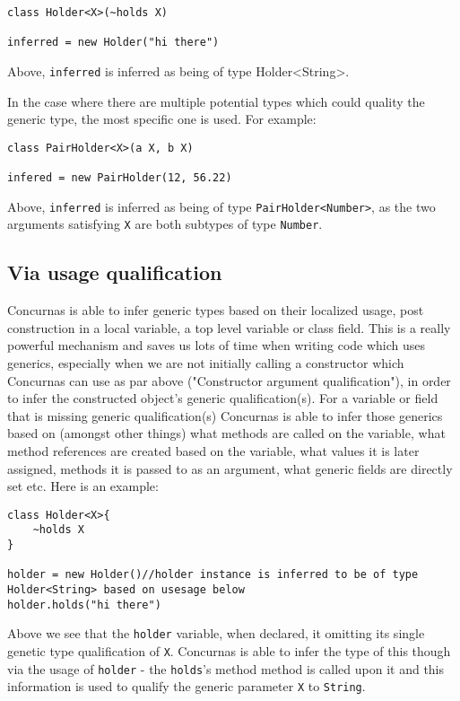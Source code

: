 \documentclass[conc-doc]{subfiles}
\begin{document}
\begin{lstlisting}
class Holder<X>(~holds X)

inferred = new Holder("hi there")
\end{lstlisting}

Above, \lstinline{inferred} is inferred as being of type Holder<String>.

In the case where there are multiple potential types which could quality the generic type, the most specific one is used. For example:

\begin{lstlisting}
class PairHolder<X>(a X, b X)

infered = new PairHolder(12, 56.22)
\end{lstlisting}

Above, \lstinline{inferred} is inferred as being of type \lstinline{PairHolder<Number>}, as the two arguments satisfying \lstinline{X} are both subtypes of type \lstinline{Number}.

\subsection{Via usage qualification}
Concurnas is able to infer generic types based on their localized usage, post construction in a local variable, a top level variable or class field. This is a really powerful mechanism and saves us lots of time when writing code which uses generics, especially when we are not initially calling a constructor which Concurnas can use as par above ("Constructor argument qualification"), in order to infer the constructed object's generic qualification(s). For a variable or field that is missing generic qualification(s) Concurnas is able to infer those generics based on (amongst other things) what methods are called on the variable, what method references are created based on the variable, what values it is later assigned, methods it is passed to as an argument, what generic fields are directly set etc. Here is an example:

\begin{lstlisting}
class Holder<X>{
	~holds X
}

holder = new Holder()//holder instance is inferred to be of type Holder<String> based on usesage below
holder.holds("hi there")
\end{lstlisting}

Above we see that the \lstinline{holder} variable, when declared, it omitting its single genetic type qualification of \lstinline{X}. Concurnas is able to infer the type of this though via the usage of \lstinline{holder} - the \lstinline{holds}'s method method is called upon it and this information is used to qualify the generic parameter \lstinline{X} to \lstinline{String}.
\end{document}
